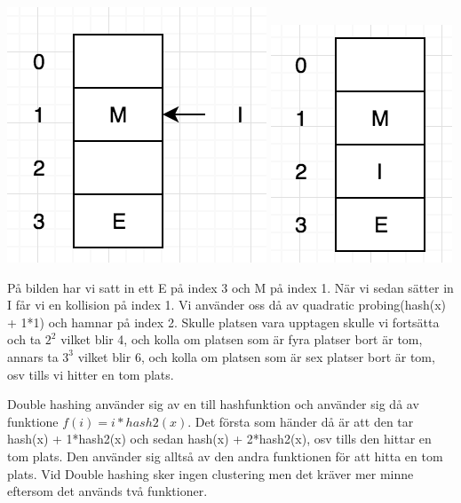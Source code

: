 \documentclass[a5paper,10pt,oneside]{article}
\begin{document}
 \includegraphics[scale=1]{Qua2}
 \includegraphics[scale=1]{Qua1}
 
 På bilden har vi satt in ett E på index 3 och M på index 1. När vi sedan sätter in I får vi en kollision på index 1. Vi använder oss då av quadratic probing(hash(x) + 1*1) och hamnar på index 2. Skulle platsen vara upptagen skulle vi fortsätta och ta $2^2$ vilket blir 4, och kolla om platsen som är fyra platser bort är tom, annars ta $3^3$ vilket blir 6, och kolla om platsen som är sex platser bort är tom, osv tills vi hitter en tom plats.

Double hashing använder sig av en till hashfunktion och använder sig då av funktione $f(i) =  i*hash2(x)$. Det första som händer då är att den tar hash(x) + 1*hash2(x) och sedan hash(x) + 2*hash2(x), osv tills den hittar en tom plats. Den använder sig alltså av den andra funktionen för att hitta en tom plats. Vid Double hashing sker ingen clustering men det kräver mer minne eftersom det används två funktioner.
\end{document}
